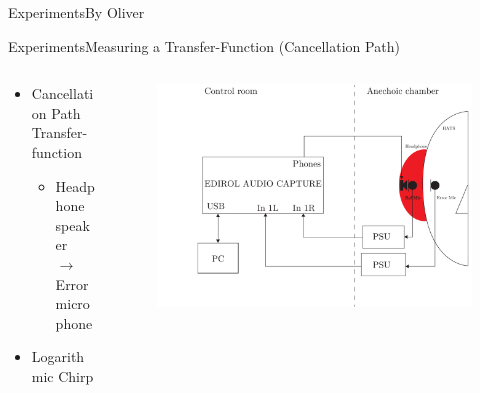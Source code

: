 \begin{frame}{Experiments}{By Oliver}
\begin{frame}{Experiments}{Measuring a Transfer-Function (Cancellation Path)}		
	\begin{columns}
		\begin{column}{0.3\textwidth}
			\begin{itemize}
				\item Cancellation Path Transfer-function
				\begin{itemize}
					\item Headphone speaker \\ $\rightarrow$ Error microphone
				\end{itemize}
				\item{Logarithmic Chirp}
			\end{itemize}
		\end{column}
		\begin{column}{0.7\textwidth} 
			\begin{figure}[h]
				\includegraphics[width=1\textwidth]{figures/CancellationPath.pdf}
			\end{figure}
		\end{column}
	\end{columns}
\end{frame}


\end{frame}
